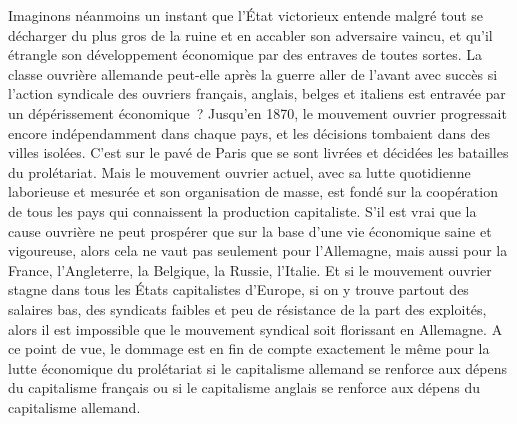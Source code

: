 \documentclass[french,twoside]{book} %
\begin{document}
Imaginons néanmoins un instant que l’État victorieux entende malgré tout se décharger du plus gros de la ruine et en accabler son adversaire vaincu, et qu’il étrangle son développement économique par des entraves de toutes sortes. La classe ouvrière allemande peut-elle après la guerre aller de l’avant avec succès si l’action syndicale des ouvriers français, anglais, belges et italiens est entravée par un dépérissement économique ? Jusqu’en 1870, le mouvement ouvrier progressait encore indépendamment dans chaque pays, et les décisions tombaient dans des villes isolées. C'est sur le pavé de Paris que se sont livrées et décidées les batailles du prolétariat. Mais le mouvement ouvrier actuel, avec sa lutte quotidienne laborieuse et mesurée et son organisation de masse, est fondé sur la coopération de tous les pays qui connaissent la production capitaliste. S'il est vrai que la cause ouvrière ne peut prospérer que sur la base d’une vie économique saine et vigoureuse, alors cela ne vaut pas seulement pour l’Allemagne, mais aussi pour la France, l’Angleterre, la Belgique, la Russie, l’Italie. Et si le mouvement ouvrier stagne dans tous les États capitalistes d’Europe, si on y trouve partout des salaires bas, des syndicats faibles et peu de résistance de la part des exploités, alors il est impossible que le mouvement syndical soit florissant en Allemagne. A ce point de vue, le dommage est en fin de compte exactement le même pour la lutte économique du prolétariat si le capitalisme allemand se renforce aux dépens du capitalisme français ou si le capitalisme anglais se renforce aux dépens du capitalisme allemand.\par
\end{document}
